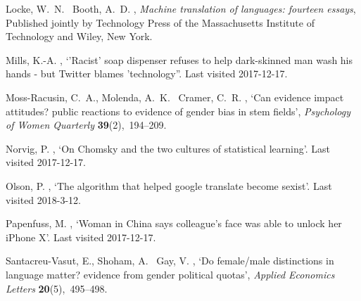 \documentclass[fleqn,10pt]{article}
\begin{document}
\begin{thebibliography}{xx}
Locke, W.~N. \harvardand\ Booth, A.~D.  \harvardyearright
  , {\em Machine translation of languages: fourteen essays}, Published jointly
  by Technology Press of the Massachusetts Institute of Technology and Wiley,
  New York.

Mills, K.-A.  \harvardyearright , `'{R}acist' soap
  dispenser refuses to help dark-skinned man wash his hands - but {T}witter
  blames 'technology''.
\newblock Last visited 2017-12-17.
\newline{}

Moss-Racusin, C.~A., Molenda, A.~K. \harvardand\ Cramer, C.~R.
  \harvardyearright , `Can evidence impact attitudes?
  public reactions to evidence of gender bias in stem fields', {\em Psychology
  of Women Quarterly} {\bf 39}(2),~194--209.

Norvig, P.  \harvardyearright , `On {C}homsky and the two
  cultures of statistical learning'.
\newblock Last visited 2017-12-17.
\newline{}

Olson, P.  \harvardyearright , `The algorithm that helped
  google translate become sexist'.
\newblock Last visited 2018-3-12.
\newline{}

Papenfuss, M.  \harvardyearright , `Woman in {C}hina says
  colleague's face was able to unlock her i{P}hone {X}'.
\newblock Last visited 2017-12-17.
\newline{}

Santacreu-Vasut, E., Shoham, A. \harvardand\ Gay, V.  \harvardyearleft
  2013\harvardyearright , `Do female/male distinctions in language matter?
  evidence from gender political quotas', {\em Applied Economics Letters} {\bf
  20}(5),~495--498.


\end{thebibliography}
\end{document}

